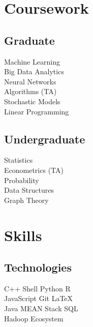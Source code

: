 \documentclass[letterpaper]{deedy-resume} %
\begin{document}
\begin{minipage}[t]{0.33\textwidth}
\sectionspace %


\section{Coursework}

\subsection{Graduate}

Machine Learning \\
Big Data Analytics \\
Neural Networks \\
Algorithms (TA) \\
Stochastic Models \\
Linear Programming

\sectionspace %


\subsection{Undergraduate}

Statistics \\
Econometrics (TA) \\
Probability \\
Data Structures \\
Graph Theory \\

\sectionspace %


\section{Skills}

\subsection{Technologies}

C++ \textbullet{} Shell \textbullet{} Python \textbullet{} R \\
JavaScript \textbullet{} Git \textbullet{} \LaTeX\ \\ 
Java \textbullet{} MEAN Stack \textbullet{} SQL \\
Hadoop Ecosystem

\sectionspace %


\end{minipage} %
\end{document}

